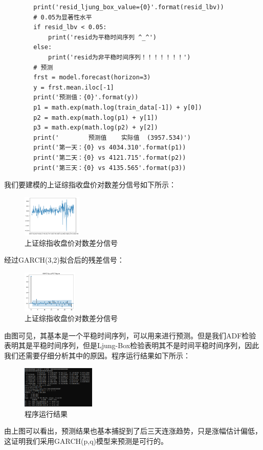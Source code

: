 \documentclass{article}
\begin{document}
\begin{lstlisting}
        print('resid_ljung_box_value={0}'.format(resid_lbv))
        # 0.05为显著性水平
        if resid_lbv < 0.05:
            print('resid为平稳时间序列 ^_^')
        else:
            print('resid为非平稳时间序列！！！！！！！')
        # 预测
        frst = model.forecast(horizon=3)
        y = frst.mean.iloc[-1]
        print('预测值：{0}'.format(y))
        p1 = math.exp(math.log(train_data[-1]) + y[0])
        p2 = math.exp(math.log(p1) + y[1])
        p3 = math.exp(math.log(p2) + y[2])
        print('        预测值    实际值  (3957.534)')
        print('第一天：{0} vs 4034.310'.format(p1))
        print('第二天：{0} vs 4121.715'.format(p2))
        print('第三天：{0} vs 4135.565'.format(p3))
\end{lstlisting}
我们要建模的上证综指收盘价对数差分信号如下所示：
\begin{figure}[H]
	\caption{上证综指收盘价对数差分信号}
	\label{f000037}
	\centering
	\includegraphics[height=2cm]{images/f000037}
\end{figure}
经过GARCH(3,2)拟合后的残差信号：
\begin{figure}[H]
	\caption{上证综指收盘价对数差分信号}
	\label{f000038}
	\centering
	\includegraphics[height=2cm]{images/f000038}
\end{figure}
由图可见，其基本是一个平稳时间序列，可以用来进行预测。但是我们ADF检验表明其是平稳时间序列，但是Ljung-Box检验表明其不是时间平稳时间序列，因此我们还需要仔细分析其中的原因。程序运行结果如下所示：
\begin{figure}[H]
	\caption{程序运行结果}
	\label{f000039}
	\centering
	\includegraphics[height=2cm]{images/f000039}
\end{figure}
由上图可以看出，预测结果也基本捕捉到了后三天连涨趋势，只是涨幅估计偏低，这证明我们采用GARCH(p,q)模型来预测是可行的。
\end{document}
